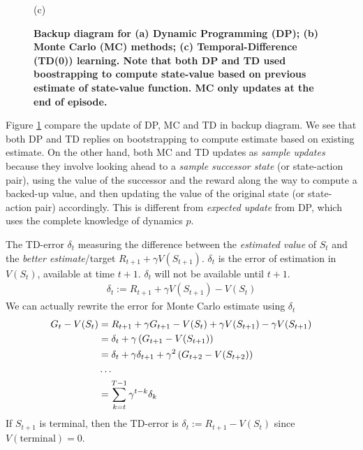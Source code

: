 \documentclass[11pt]{article}
\begin{document}
\begin{figure}
\begin{minipage}[t]{0.3\linewidth}
  \vspace{-7pt}
 \centerline{\footnotesize{(c) }}
\end{minipage}
\caption{\footnotesize{\textbf{Backup diagram for (a) Dynamic Programming (DP); (b) Monte Carlo (MC) methods; (c) Temporal-Difference (TD(0)) learning. Note that both DP and TD used boostrapping to compute state-value based on previous estimate of state-value function. MC only updates at the end of episode.}}}
\label{fig: backup_diagram_dp_mc_td}
\end{figure}

Figure \ref{fig: backup_diagram_dp_mc_td} compare the update of DP, MC and TD in backup diagram. We see that both DP and TD replies on bootstrapping to compute estimate based on existing estimate. On the other hand, both MC and TD updates as \emph{sample updates} because they involve looking ahead to a \emph{sample successor state} (or state-action pair), using the value of the successor and the reward along the way to compute a backed-up value, and then updating the value of the original state (or state-action pair) accordingly. This is different from \emph{expected update} from DP, which uses the complete knowledge of dynamics $p$.

The TD-error $\delta_{t}$ measuring the difference between the \emph{estimated value} of $S_t$ and the \emph{better estimate}/target $R_{t+1} + \gamma V(S_{t+1})$. $\delta_{t}$ is the error of estimation in $V(S_{t})$, available at time $t + 1$. $\delta_{t}$ will not be available until $t+1$. 
\begin{align}
\delta_{t} := R_{t+1} + \gamma V(S_{t+1})  - V(S_{t}) \label{eqn: td_error}
\end{align} We can actually rewrite the error for Monte Carlo estimate using $\delta_{t}$
\begin{align*}
G_{t} -  V(S_{t}) &= R_{t+1} + \gamma G_{t+1} - V(S_{t}) +  \gamma V(S_{t+1}) -  \gamma V(S_{t+1})  \\
&= \delta_{t} +  \gamma \left(G_{t+1} -V(S_{t+1})\right) \\
&=  \delta_{t} +   \gamma\delta_{t+1} + \gamma^2 \left(G_{t+2} -V(S_{t+2})\right) \\
&\ldots\\
&= \sum_{k=t}^{T-1}\gamma^{t-k}\delta_{k}
\end{align*} If $S_{t+1}$ is terminal, then the TD-error is $\delta_{t} := R_{t+1}  - V(S_{t}) $ since $V(\text{terminal}) = 0$.
\end{document}
